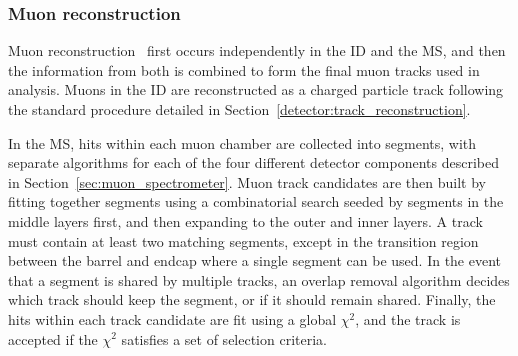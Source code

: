 \subsubsection{Muon reconstruction}\label{detector:muon_reconstruction}
Muon reconstruction~\cite{2014.muon-reconstruction-run1, 2016.muon-reconstruction-13tev} first occurs independently in the ID and the MS, and then the information from both is combined to form the final muon tracks used in analysis.
Muons in the ID are reconstructed as a charged particle track following the standard procedure detailed in Section~\ref{detector:track_reconstruction}.

In the MS, hits within each muon chamber are collected into segments, with separate algorithms for each of the four different detector components described in Section~\ref{sec:muon_spectrometer}.
Muon track candidates are then built by fitting together segments using a combinatorial search seeded by segments in the middle layers first, and then expanding to the outer and inner layers.
A track must contain at least two matching segments, except in the transition region between the barrel and endcap where a single segment can be used.
In the event that a segment is shared by multiple tracks, an overlap removal algorithm decides which track should keep the segment, or if it should remain shared.
Finally, the hits within each track candidate are fit using a global $\chi^2$, and the track is accepted if the $\chi^2$ satisfies a set of selection criteria.

